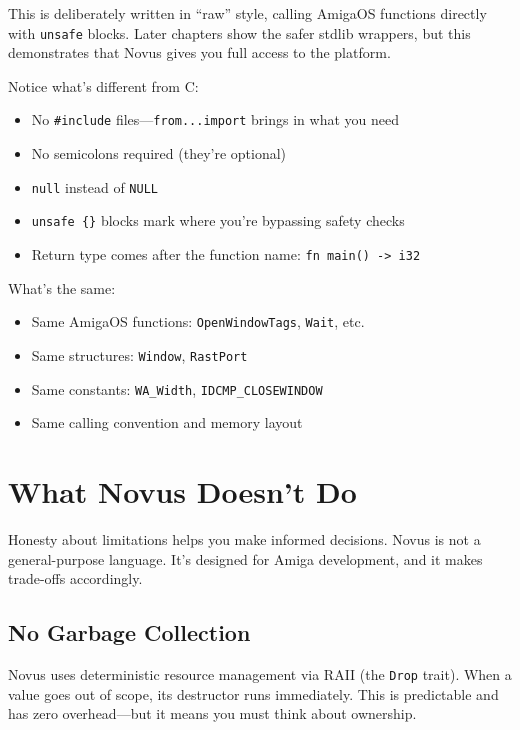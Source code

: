 This is deliberately written in ``raw'' style, calling AmigaOS functions directly with \texttt{unsafe} blocks. Later chapters show the safer stdlib wrappers, but this demonstrates that Novus gives you full access to the platform.

\begin{comingfromc}
Notice what's different from C:
\begin{itemize}
    \item No \texttt{\#include} files---\texttt{from...import} brings in what you need
    \item No semicolons required (they're optional)
    \item \texttt{null} instead of \texttt{NULL}
    \item \texttt{unsafe \{\}} blocks mark where you're bypassing safety checks
    \item Return type comes after the function name: \texttt{fn main() -> i32}
\end{itemize}

What's the same:
\begin{itemize}
    \item Same AmigaOS functions: \texttt{OpenWindowTags}, \texttt{Wait}, etc.
    \item Same structures: \texttt{Window}, \texttt{RastPort}
    \item Same constants: \texttt{WA\_Width}, \texttt{IDCMP\_CLOSEWINDOW}
    \item Same calling convention and memory layout
\end{itemize}
\end{comingfromc}

\section{What Novus Doesn't Do}

Honesty about limitations helps you make informed decisions. Novus is not a general-purpose language. It's designed for Amiga development, and it makes trade-offs accordingly.

\subsection{No Garbage Collection}

Novus uses deterministic resource management via RAII (the \texttt{Drop} trait). When a value goes out of scope, its destructor runs immediately. This is predictable and has zero overhead---but it means you must think about ownership.

